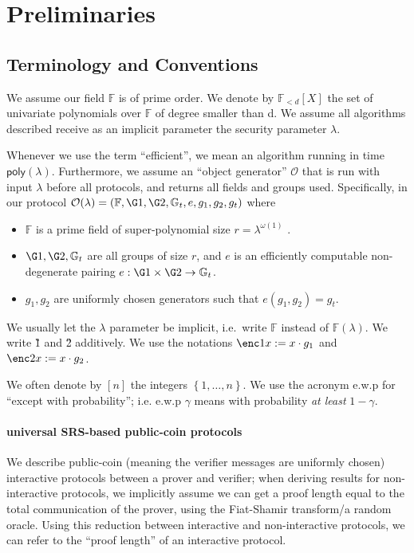 \documentclass[11pt]{article} %
\newcommand{\Gt}{\ensuremath{{\mathbb G}_t}\xspace}
\newcommand{\F}{\ensuremath{\mathbb F}\xspace}
\newcommand{\defeq}{:=}
\newcommand{\set}[1]{\ensuremath{\left\{#1\right\}}\xspace}
\newcommand{\polysofdeg}[1]{\ensuremath{\F_{< #1}[X]}\xspace}
\newcommand{\obgen}{\ensuremath{\mathcal O}\xspace}
\newcommand{\poly}{\ensuremath{\mathsf{poly(\lambda)}}\xspace}
\begin{document}
\section{Preliminaries}


\subsection{Terminology and Conventions}\label{sec:terminology}
We assume our field \F is of prime order.
We denote by \polysofdeg{d} the set of univariate polynomials over \F of degree smaller than d. 
We assume all algorithms described receive as an implicit parameter the security parameter $\lambda$.

Whenever we use the term “efficient”, we mean an algorithm running in time \poly. Furthermore,
we assume an “object generator” \obgen that is run with input $\lambda$ before all protocols, and returns all fields and groups used. Specifically, in our protocol $\obgen(\lambda) = (\F, \G1, \G2, \Gt, e, g_1, g_2,g_t)$ where
\begin{itemize}
\item \F is a prime field of super-polynomial size $r = \lambda^{\omega(1)}$
.
\item $\G1,\G2,\Gt$ are all groups of size $r$, and $e$ is an efficiently computable non-degenerate pairing
$e : \G1 \times \G2 \to \Gt$.
\item $g_1,g_2$ are uniformly chosen generators such that $e(g_1, g_2) = g_t$.
\end{itemize}
We usually let the $\lambda$ parameter be implicit, i.e.\ write \F instead of $\F(\lambda)$.
We write \G1 and \G2 additively. We use the notations $\enc1{x}\defeq x\cdot g_1$ and $\enc2{x}\defeq x\cdot g_2$.

We often denote by $[n]$ the integers \set{1,\ldots,n}.
We use the acronym e.w.p for ``except with probability''; i.e. e.w.p $\gamma$ means with probability \emph{at least} $1-\gamma$.

\paragraph{universal SRS-based public-coin protocols}
We describe public-coin (meaning the verifier messages are uniformly chosen) interactive protocols between a prover and verifier; when deriving results for non-interactive protocols, we implicitly assume we can get a proof length equal to the total communication of the prover, using the Fiat-Shamir transform/a random oracle. Using this reduction between interactive and non-interactive protocols, we can refer to the ``proof length'' of an interactive protocol. 
\end{document}
